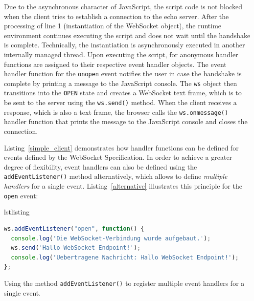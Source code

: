 \documentclass[a4paper, justified, notoc]{tufte-handout} %
\makeatletter
\newenvironment{listing}[1][htbp] %
  {\ifvmode\else\unskip\fi\begin{@tufte@float}[#1]{lstlisting}{}}
  {\end{@tufte@float} } %
\makeatother
\begin{document}
Due to the asynchronous character of JavaScript, the script code is not blocked when the client tries to establish a connection to the echo server. After the processing of line 1 (instantiation of the WebSocket object), the runtime environment continues executing the script and does not wait until the handshake is complete. Technically, the instantiation is asynchronously executed in another internally managed thread. Upon executing the script, for anonymous handler functions are assigned to their respective event handler objects. The event handler function for the \texttt{onopen} event notifies the user in case the handshake is complete by printing a message to the JavaScript console. The \texttt{ws} object then transitions into the \texttt{OPEN} state and creates a WebSocket text frame, which is to be sent to the server using the \texttt{ws.send()} method. When the client receives a response, which is also a text frame, the browser calls the \texttt{ws.onmessage()} handler function that prints the message to the JavaScript console and closes the connection.


Listing~\ref{simple_client} demonstrates how handler functions can be defined for events defined by the WebSocket Specification. In order to achieve a greater degree of flexibility, event handlers can also be defined using the \texttt{addEventListener()} method alternatively, which allows to define \emph{multiple handlers} for a single event.  Listing~\ref{alternative} illustrates this principle for the \texttt{open} event:

\begin{listing} %
\begin{lstlisting}[language=JavaScript]
ws.addEventListener("open", function() {
  console.log('Die WebSocket-Verbindung wurde aufgebaut.'); 
  ws.send('Hallo WebSocket Endpoint!');
  console.log('Uebertragene Nachricht: Hallo WebSocket Endpoint!');
};
\end{lstlisting}
	\caption{Using the method \texttt{addEventListener()} to register multiple event handlers for a single event.}
	\label{alternative}
\end{listing}
\end{document}
